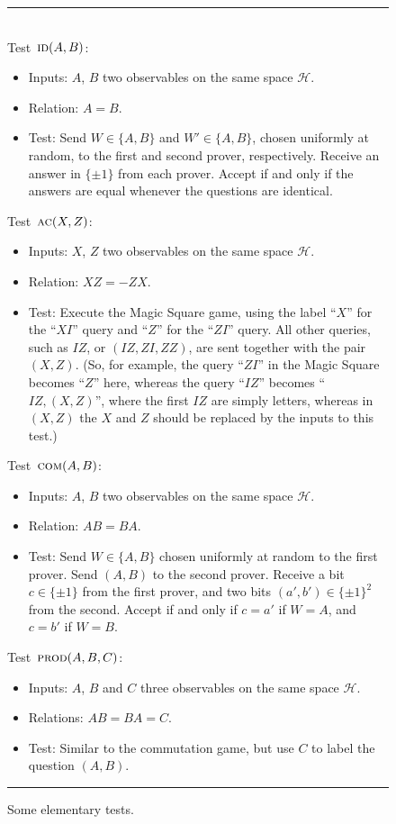 \documentclass[11pt]{article}
\numberwithin{equation}{section}
\theoremstyle{definition}
\theoremstyle{plain}
\newcommand{\mH}{\mathcal{H}}
\newcommand{\prodt}{\textsc{prod}}
\newcommand{\comt}{\textsc{com}}
\newcommand{\act}{\textsc{ac}}
\newcommand{\idt}{\textsc{id}}
\begin{document}
\begin{figure}[H]
\rule[1ex]{\textwidth}{0.5pt}\\
\justifying
Test~$\idt(A,B)$:
\begin{itemize}
\setlength\itemsep{-0.25em}   %
    \item Inputs: $A$, $B$ two observables on the same space $\mH$.
    \item Relation: $A=B$.
    \item Test: Send $W \in \{A,B\}$ and $W'\in\{A,B\}$, chosen uniformly at random, to the first and second prover, %
 respectively. Receive an answer in $\{\pm 1\}$ from each prover. Accept if and only if the answers are equal whenever the questions are identical. 
\end{itemize}

Test~$\act(X,Z)$:
\begin{itemize}
\setlength\itemsep{-0.25em}   %
    \item Inputs: $X$, $Z$ two observables on the same space $\mH$.
    \item Relation: $XZ=-ZX$.
    \item Test: Execute the Magic Square game, using the label ``$X$'' for the ``$XI$'' query and ``$Z$'' for the ``$ZI$'' query. All other queries, such as $IZ$, or $(IZ,ZI,ZZ)$, are sent together with the pair $(X,Z)$. (So, for example, the query ``$ZI$'' in the Magic Square becomes ``$Z$'' here, whereas the query ``$IZ$'' becomes ``$IZ,(X,Z)$'', where the first $IZ$ are simply letters, whereas in $(X,Z)$ the $X$ and $Z$ should be replaced by the inputs to this test.)
\end{itemize}

Test~$\comt(A,B)$:
\begin{itemize}
\setlength\itemsep{-0.25em}   %
    \item Inputs: $A$, $B$ two observables on the same space $\mH$.
    \item Relation: $AB=BA$.
    \item Test: Send $W\in\{A,B\}$ chosen uniformly at random to the first prover. Send $(A,B)$ to the second prover. Receive a bit $c\in\{\pm 1\}$ from the first prover, and two bits $(a',b')\in\{\pm 1\}^2$ from the second. Accept if and only if $c=a'$ if $W=A$, and $c=b'$ if $W=B$. 
\end{itemize}

Test~$\prodt(A,B,C)$:
\begin{itemize}
\setlength\itemsep{-0.25em}   %
    \item Inputs: $A$, $B$ and $C$ three observables on the same space $\mH$.
    \item Relations: $AB=BA=C$.
    \item Test: Similar to the commutation game, but use $C$ to label the question $(A,B)$.
\end{itemize}
\rule[2ex]{\textwidth}{0.5pt}\vspace{-.5cm}
\caption{Some elementary tests.}
\label{fig:elementary}
\end{figure}
\end{document}
